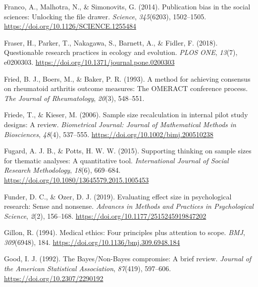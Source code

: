 \documentclass[
  letterpaper,
  DIV=11,
  numbers=noendperiod]{scrreprt}
\newlength{\cslhangindent}
\newlength{\cslentryspacingunit} %
\newenvironment{CSLReferences}[2] %
 {%
  \setlength{\parindent}{0pt}
  \ifodd #1
  \let\oldpar\par
  \def\par{\hangindent=\cslhangindent\oldpar}
  \fi
  \setlength{\parskip}{#2\cslentryspacingunit}
 }%
 {}
\begin{document}
\begin{CSLReferences}{1}{0}
\leavevmode{}%
Franco, A., Malhotra, N., \& Simonovits, G. (2014). Publication bias in
the social sciences: {Unlocking} the file drawer. \emph{Science},
\emph{345}(6203), 1502--1505.
\url{https://doi.org/10.1126/SCIENCE.1255484}

\leavevmode{}%
Fraser, H., Parker, T., Nakagawa, S., Barnett, A., \& Fidler, F. (2018).
Questionable research practices in ecology and evolution. \emph{PLOS
ONE}, \emph{13}(7), e0200303.
\url{https://doi.org/10.1371/journal.pone.0200303}

\leavevmode{}%
Fried, B. J., Boers, M., \& Baker, P. R. (1993). A method for achieving
consensus on rheumatoid arthritis outcome measures: The {OMERACT}
conference process. \emph{The Journal of Rheumatology}, \emph{20}(3),
548--551.

\leavevmode{}%
Friede, T., \& Kieser, M. (2006). Sample size recalculation in internal
pilot study designs: A review. \emph{Biometrical Journal: Journal of
Mathematical Methods in Biosciences}, \emph{48}(4), 537--555.
\url{https://doi.org/10.1002/bimj.200510238}

\leavevmode{}%
Fugard, A. J. B., \& Potts, H. W. W. (2015). Supporting thinking on
sample sizes for thematic analyses: A quantitative tool.
\emph{International Journal of Social Research Methodology},
\emph{18}(6), 669--684.
\url{https://doi.org/10.1080/13645579.2015.1005453}

\leavevmode{}%
Funder, D. C., \& Ozer, D. J. (2019). Evaluating effect size in
psychological research: {Sense} and nonsense. \emph{Advances in Methods
and Practices in Psychological Science}, \emph{2}(2), 156--168.
\url{https://doi.org/10.1177/2515245919847202}

\leavevmode{}%
Gillon, R. (1994). Medical ethics: Four principles plus attention to
scope. \emph{BMJ}, \emph{309}(6948), 184.
\url{https://doi.org/10.1136/bmj.309.6948.184}

\leavevmode{}%
Good, I. J. (1992). The {Bayes}/{Non-Bayes} compromise: {A} brief
review. \emph{Journal of the American Statistical Association},
\emph{87}(419), 597--606. \url{https://doi.org/10.2307/2290192}


\end{CSLReferences}
\end{document}
